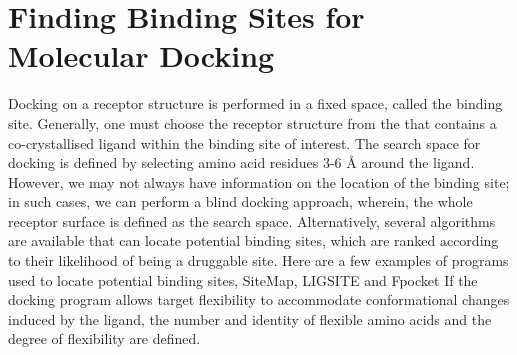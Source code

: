 \chapter*{Finding Binding Sites for Molecular Docking}
Docking on a receptor structure is performed in a fixed space, called the binding site. Generally, one must choose the receptor structure from the {\color{red}{wwPDB}} that contains a co-crystallised ligand within the binding site of interest. The search space for docking is defined by selecting amino acid residues 3-6 \r{A} around the ligand.  However, we may not always have information on the location of the binding site; in such cases, we can perform a blind docking approach, wherein, the whole receptor surface is defined as the search space. Alternatively, several algorithms are available that can locate potential binding sites, which are ranked according to their likelihood of being a druggable site. Here are a few examples of programs used to locate potential binding sites, SiteMap\cite{bib7}, LIGSITE \cite{bib8} and Fpocket\cite{bib9} If the docking program allows target flexibility to accommodate conformational changes induced by the ligand, the number and identity of flexible amino acids and the degree of flexibility are defined. 

